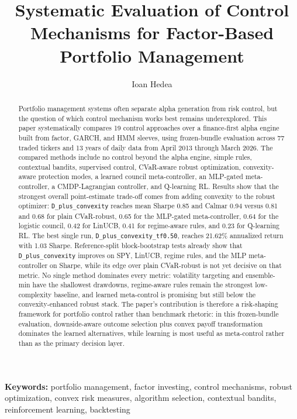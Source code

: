 \documentclass[11pt]{article}
\title{\textbf{Systematic Evaluation of Control Mechanisms for Factor-Based Portfolio Management}}
\author{Ioan Hedea}
\date{}
\begin{document}
\maketitle

\begin{abstract}
Portfolio management systems often separate alpha generation from risk control,
but the question of which control mechanism works best remains underexplored.
This paper systematically compares 19 control approaches over a finance-first
alpha engine built from factor, GARCH, and HMM sleeves, using frozen-bundle
evaluation across 77 traded tickers and 13 years of daily data from April 2013
through March 2026. The compared methods include no control beyond the alpha
engine, simple rules, contextual bandits, supervised control, CVaR-aware robust
optimization, convexity-aware protection modes, a learned council
meta-controller, an MLP-gated meta-controller, a CMDP-Lagrangian controller,
and Q-learning RL. Results show
that the strongest overall point-estimate trade-off comes from adding convexity
to the robust optimizer: \texttt{D\_plus\_convexity} reaches mean Sharpe 0.85
and Calmar 0.94 versus 0.81 and 0.68 for plain CVaR-robust, 0.65 for the
MLP-gated meta-controller, 0.64 for the logistic council, 0.42 for LinUCB,
0.41 for regime-aware rules, and 0.23 for Q-learning RL. The best single run,
\texttt{D\_plus\_convexity\_tf0.50}, reaches 21.62\% annualized return with
1.03 Sharpe. Reference-split block-bootstrap tests already show that
\texttt{D\_plus\_convexity} improves on SPY, LinUCB, regime rules, and the
MLP meta-controller on Sharpe, while its edge over plain CVaR-robust is not
yet decisive on that metric. No single method dominates every metric:
volatility targeting and ensemble-min have the shallowest drawdowns,
regime-aware rules remain the strongest low-complexity baseline, and learned
meta-control is promising but still below the convexity-enhanced robust stack.
The paper's contribution is therefore a risk-shaping framework for portfolio control rather than benchmark rhetoric: in this frozen-bundle evaluation, downside-aware outcome selection plus convex payoff transformation dominates the learned alternatives, while learning is most useful as meta-control rather than as the primary decision layer.
\end{abstract}

\medskip
\noindent\textbf{Keywords:} portfolio management, factor investing, control mechanisms, robust optimization, convex risk measures, algorithm selection, contextual bandits, reinforcement learning, backtesting
\end{document}
